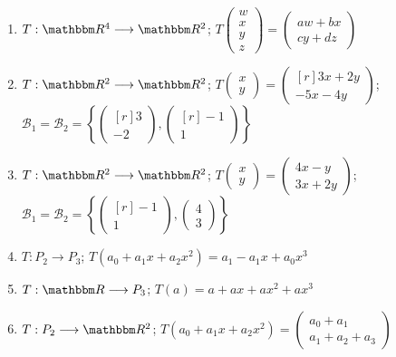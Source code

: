 \begin{enumerate}[resume]
    \item $T: \RR[4] \longrightarrow \RR[2]$; $T\begin{pmatrix*}w \\ x \\ y \\ z\end{pmatrix*}=\begin{pmatrix*}a w+b x \\ c y+d z\end{pmatrix*}$
    \item $T: \RR[2] \longrightarrow \RR[2]$; $T\begin{pmatrix*}x \\ y\end{pmatrix*}=\begin{pmatrix*}[r]3 x+2 y \\ -5 x-4 y\end{pmatrix*}$; $\mathcal{B}_1=\mathcal{B}_2=\left\{\begin{pmatrix*}[r]3 \\ -2\end{pmatrix*},\begin{pmatrix*}[r]-1 \\ 1\end{pmatrix*}\right\}$
    \item $T: \RR[2] \longrightarrow \RR[2]$; $T\begin{pmatrix*}x \\ y\end{pmatrix*}=\begin{pmatrix*}4 x-y \\ 3 x+2 y\end{pmatrix*}$; $\mathcal{B}_1=\mathcal{B}_2=\left\{\begin{pmatrix*}[r]-1 \\ 1\end{pmatrix*},\begin{pmatrix*}4 \\ 3\end{pmatrix*}\right\}$
    \item $T: P_{2} \longrightarrow P_{3}$; $T\left(a_{0}+a_{1} x+a_{2} x^{2}\right)=a_{1}-a_{1} x+a_{0} x^{3}$
    \item $T: \RR \longrightarrow P_{3}$; $T(a)=a+a x+a x^{2}+a x^{3}$
    \item $T: P_{2} \longrightarrow \RR[2]$; $T\left(a_{0}+a_{1} x+a_{2} x^{2}\right)=\begin{pmatrix*}a_{0}+a_{1} \\ a_{1}+a_{2}+a_{3}\end{pmatrix*}$

\end{enumerate}
